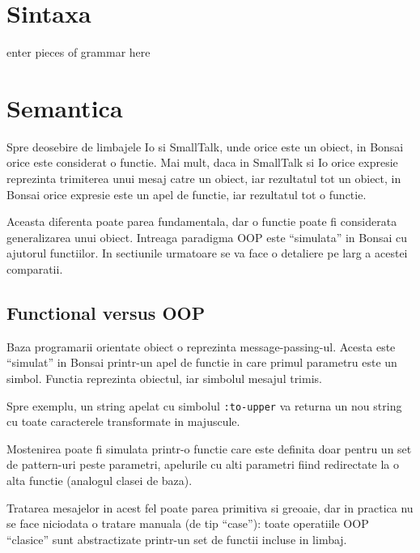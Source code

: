 \documentclass[12pt,a4paper]{report}
\begin{document}
\chapter{Sintaxa}

enter pieces of grammar here

\chapter{Semantica}

Spre deosebire de limbajele Io\cite{io} si SmallTalk\cite{smalltalk}, unde orice este un obiect, in Bonsai orice este considerat o functie. Mai mult, daca in SmallTalk si Io orice expresie reprezinta trimiterea unui mesaj catre un obiect, iar rezultatul tot un obiect, in Bonsai orice expresie este un apel de functie, iar rezultatul tot o functie. 

Aceasta diferenta poate parea fundamentala, dar o functie poate fi considerata generalizarea unui obiect. Intreaga paradigma OOP este ``simulata'' in Bonsai cu ajutorul functiilor. In sectiunile urmatoare se va face o detaliere pe larg a acestei comparatii. 

\section{Functional versus OOP}

Baza programarii orientate obiect o reprezinta message-passing-ul. Acesta este ``simulat'' in Bonsai printr-un apel de functie in care primul parametru este un simbol. Functia reprezinta obiectul, iar simbolul mesajul trimis. 

Spre exemplu, un string apelat cu simbolul \texttt{:to-upper} va returna un nou string cu toate caracterele transformate in majuscule. 

Mostenirea poate fi simulata printr-o functie care este definita doar pentru un set de pattern-uri peste parametri, apelurile cu alti parametri fiind redirectate la o alta functie (analogul clasei de baza).

Tratarea mesajelor in acest fel poate parea primitiva si greoaie, dar in practica nu se face niciodata o tratare manuala (de tip ``case''): toate operatiile OOP ``clasice'' sunt abstractizate printr-un set de functii incluse in limbaj.

{}

\end{document}
